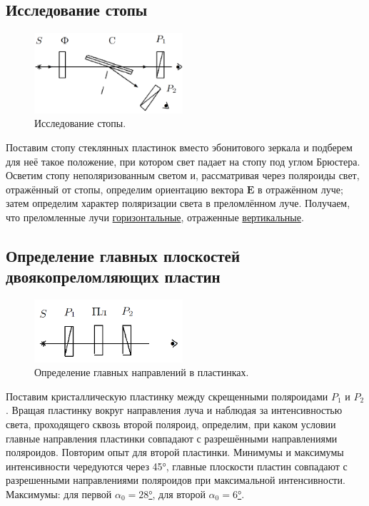 \documentclass[a4paper,12pt]{article} %
\begin{document}
\subsection{Исследование стопы}
\begin{figure}
	\includegraphics[width=5.5cm]{Screenshot_2.png}
	\caption{Исследование стопы.}
	\label{pic:2}
\end{figure}
Поставим стопу стеклянных пластинок вместо эбонитового зеркала и подберем для неё такое положение, при котором свет падает на стопу под углом Брюстера. Осветим стопу неполяризованным светом и, рассматривая через поляроиды свет, отражённый от стопы, определим ориентацию вектора $ \mathbf{E} $ в отражённом луче; затем определим характер поляризации света в преломлённом луче. Получаем, что преломленные лучи \underline{горизонтальные}, отраженные \underline{вертикальные}.

\subsection{Определение главных плоскостей двоякопреломляющих пластин}
\begin{figure}
	\includegraphics[width=5.5cm]{Screenshot_3.png}
	\caption{Определение главных направлений в пластинках.}
	\label{pic:3}
\end{figure}
Поставим кристаллическую пластинку между скрещенными поляроидами $ P_1 $ и $ P_2 $. Вращая пластинку вокруг направления луча и наблюдая за интенсивностью света, проходящего сквозь второй поляроид, определим, при каком условии главные направления пластинки совпадают с разрешёнными направлениями поляроидов. Повторим опыт для второй пластинки. Минимумы и максимумы интенсивности чередуются через 45°, главные плоскости пластин совпадают с разрешенными направлениями поляроидов при максимальной интенсивности. Максимумы: для первой \underline{$ \alpha_0 = 28 $°}, для второй \underline{$ \alpha_0 = 6 $°}.
\end{document}
